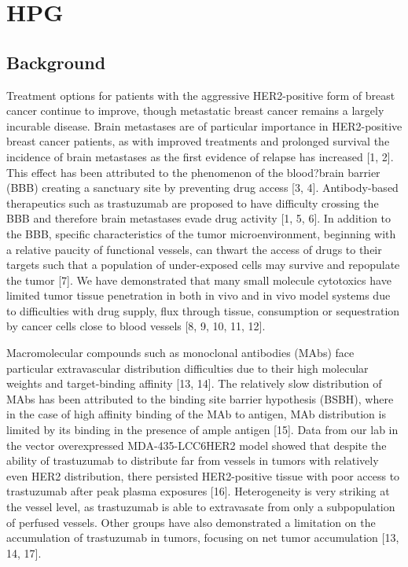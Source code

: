 
\chapter{HPG}
\label{ch:HPG_paper2}

\section{Background}

Treatment options for patients with the aggressive HER2-positive form of breast cancer continue to improve, though metastatic breast cancer remains a largely incurable disease.
Brain metastases are of particular importance in HER2-positive breast cancer patients, as with improved treatments and prolonged survival the incidence of brain metastases as the first evidence of relapse has increased [1, 2].
This effect has been attributed to the phenomenon of the blood?brain barrier (BBB) creating a sanctuary site by preventing drug access [3, 4].
Antibody-based therapeutics such as trastuzumab are proposed to have difficulty crossing the BBB and therefore brain metastases evade drug activity [1, 5, 6].
In addition to the BBB, specific characteristics of the tumor microenvironment, beginning with a relative paucity of functional vessels, can thwart the access of drugs to their targets such that a population of under-exposed cells may survive and repopulate the tumor [7].
We have demonstrated that many small molecule cytotoxics have limited tumor tissue penetration in both in vivo and in vivo model systems due to difficulties with drug supply, flux through tissue, consumption or sequestration by cancer cells close to blood vessels [8, 9, 10, 11, 12].

Macromolecular compounds such as monoclonal antibodies (MAbs) face particular extravascular distribution difficulties due to their high molecular weights and target-binding affinity [13, 14].
The relatively slow distribution of MAbs has been attributed to the binding site barrier hypothesis (BSBH), where in the case of high affinity binding of the MAb to antigen, MAb distribution is limited by its binding in the presence of ample antigen [15].
Data from our lab in the vector overexpressed MDA-435-LCC6HER2 model showed that despite the ability of trastuzumab to distribute far from vessels in tumors with relatively even HER2 distribution, there persisted HER2-positive tissue with poor access to trastuzumab after peak plasma exposures [16].
Heterogeneity is very striking at the vessel level, as trastuzumab is able to extravasate from only a subpopulation of perfused vessels.
Other groups have also demonstrated a limitation on the accumulation of trastuzumab in tumors, focusing on net tumor accumulation [13, 14, 17].

